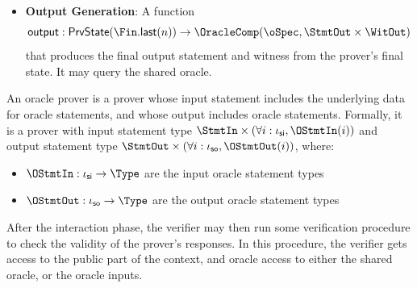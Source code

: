 \begin{definition}
\begin{itemize}
        \item \textbf{Output Generation}: A function
        \begin{equation*} \mathsf{output} : \mathsf{PrvState}(\Fin.\mathsf{last}(n)) \to \OracleComp(\oSpec, \StmtOut \times \WitOut) \end{equation*}
        that produces the final output statement and witness from the prover's final state. It
        may query the shared oracle.
    \end{itemize}
    \leanok
\end{definition}

\begin{definition}
    \label{def:oracle_prover}
    An oracle prover is a prover whose input statement includes the underlying data for oracle statements, and whose output includes oracle statements. Formally, it is a prover with input statement type \(\StmtIn \times (\forall i : \iota_{\mathsf{si}}, \OStmtIn(i))\) and output statement type \(\StmtOut \times (\forall i : \iota_{\mathsf{so}}, \OStmtOut(i))\), where:
    \begin{itemize}
        \item \(\OStmtIn : \iota_{\mathsf{si}} \to \Type\) are the input oracle statement types
        \item \(\OStmtOut : \iota_{\mathsf{so}} \to \Type\) are the output oracle statement types
    \end{itemize}
    \leanok
\end{definition}


After the interaction phase, the verifier may then run some verification procedure to check the
validity of the prover's responses. In this procedure, the verifier gets access to the public part
of the context, and oracle access to either the shared oracle, or the oracle inputs.

